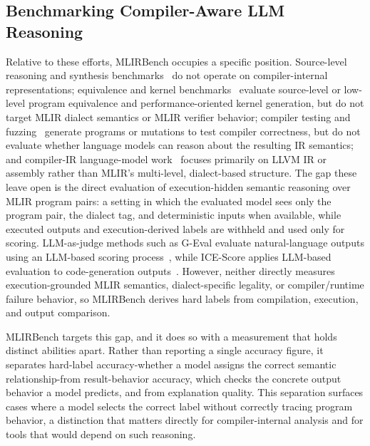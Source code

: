 \documentclass[sigplan,screen,review,anonymous]{acmart}
\providecommand{\DIFdel}[1]{{\protect\color{red} \scriptsize #1}} %
\providecommand{\DIFdelbegin}{} %
\providecommand{\DIFdelend}{} %
\begin{document}
\subsection{Benchmarking Compiler-Aware LLM Reasoning}

Relative to these efforts, MLIRBench occupies a specific position. Source-level reasoning and synthesis benchmarks~\cite{chen2021evaluating,gu2024cruxeval,jain2025livecodebench,liu2024codemind,roy2026codesense,jimenez2024swebench} do not operate on compiler-internal representations; equivalence and kernel benchmarks~\cite{wei2025equibench,ouyang2025kernelbench} evaluate source-level \DIFdelbegin \DIFdel{or low-level }\DIFdelend program equivalence and performance-oriented kernel generation, but do not target MLIR dialect semantics or MLIR verifier behavior; compiler testing and fuzzing~\cite{yang2011csmith,le2014emi,wang2023mlirsmith,suo2024mlirod,liu2023nnsmith} generate programs or mutations to test compiler correctness, but do not evaluate whether language models can reason about the resulting IR semantics; and compiler-IR language-model work~\cite{cummins2025llmcompiler,jiang2025iir} focuses primarily on LLVM IR or assembly rather than MLIR's multi-level, dialect-based structure. The gap these leave open is the direct evaluation of execution-hidden semantic reasoning over MLIR program pairs: a setting in which the evaluated model sees only the program pair, the dialect tag, and deterministic inputs when available, while executed outputs and execution-derived labels are withheld and used only for scoring. LLM-as-judge methods such as G-Eval evaluate natural-language outputs using an LLM-based scoring process~\cite{liu2023geval}, while ICE-Score applies LLM-based evaluation to code-generation outputs~\cite{zhuo2024ice}. However, neither directly measures execution-grounded MLIR semantics, dialect-specific legality, or compiler/runtime failure behavior, so MLIRBench derives hard labels from compilation, execution, and output comparison.


MLIRBench targets this gap, and it does so with a measurement that holds distinct abilities apart. Rather than reporting a single accuracy figure, it separates hard-label accuracy-whether a model assigns the correct semantic relationship-from result-behavior accuracy, which checks the concrete output behavior a model predicts, and from explanation quality. This separation surfaces cases where a model selects the correct label without correctly tracing program behavior, a distinction that matters directly for compiler-internal analysis and for tools that would depend on such reasoning.
\end{document}
